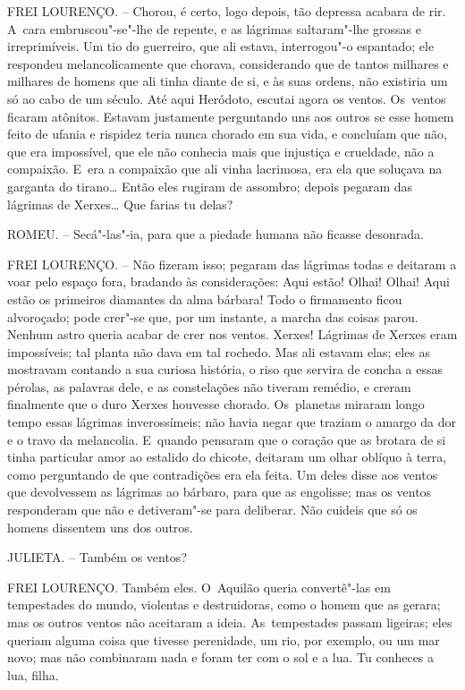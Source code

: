 FREI LOURENÇO. -- Chorou, é certo, logo depois, tão depressa acabara de
rir. A~cara embruscou"-se"-lhe de repente, e as lágrimas saltaram"-lhe
grossas e irreprimíveis. Um tio do guerreiro, que ali estava,
interrogou"-o espantado; ele respondeu melancolicamente que chorava,
considerando que de tantos milhares e milhares de homens que ali tinha
diante de si, e às suas ordens, não existiria um só ao cabo de um
século. Até aqui Heródoto, escutai agora os ventos. Os~ventos ficaram
atônitos. Estavam justamente perguntando uns aos outros se esse homem
feito de ufania e rispidez teria nunca chorado em sua vida, e concluíam
que não, que era impossível, que ele não conhecia mais que injustiça e
crueldade, não a compaixão. E~era a compaixão que ali vinha lacrimosa,
era ela que soluçava na garganta do tirano\ldots{} Então eles rugiram de
assombro; depois pegaram das lágrimas de Xerxes\ldots{} Que farias tu delas?

ROMEU. -- Secá"-las"-ia, para que a piedade humana não ficasse desonrada.

FREI LOURENÇO. -- Não fizeram isso; pegaram das lágrimas todas e
deitaram a voar pelo espaço fora, bradando às considerações: Aqui estão!
Olhai! Olhai! Aqui estão os primeiros diamantes da alma bárbara! Todo o
firmamento ficou alvoroçado; pode crer"-se que, por um instante, a marcha
das coisas parou. Nenhum astro queria acabar de crer nos ventos. Xerxes!
Lágrimas de Xerxes eram impossíveis; tal planta não dava em tal rochedo.
Mas ali estavam elas; eles as mostravam contando a sua curiosa história,
o riso que servira de concha a essas pérolas, as palavras dele, e as
constelações não tiveram remédio, e creram finalmente que o duro Xerxes
houvesse chorado. Os~planetas miraram longo tempo essas lágrimas
inverossímeis; não havia negar que traziam o amargo da dor e o travo da
melancolia. E~quando pensaram que o coração que as brotara de si tinha
particular amor ao estalido do chicote, deitaram um olhar oblíquo à
terra, como perguntando de que contradições era ela feita. Um deles
disse aos ventos que devolvessem as lágrimas ao bárbaro, para que as
engolisse; mas os ventos responderam que não e detiveram"-se para
deliberar. Não cuideis que só os homens dissentem uns dos outros.

JULIETA. -- Também os ventos?

FREI LOURENÇO. Também eles. O~Aquilão queria convertê"-las em tempestades
do mundo, violentas e destruidoras, como o homem que as gerara; mas os
outros ventos não aceitaram a ideia. As~tempestades passam ligeiras;
eles queriam alguma coisa que tivesse perenidade, um rio, por exemplo,
ou um mar novo; mas não combinaram nada e foram ter com o sol e a lua.
Tu conheces a lua, filha.

